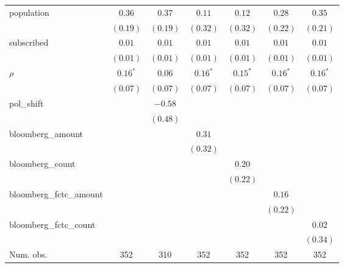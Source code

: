 \begin{table}[!h]
\begin{center}
\begin{tabular}{l c c c c c c }
population              & $0.36$       & $0.37$       & $0.11$       & $0.12$       & $0.28$       & $0.35$       \\
                        & $(0.19)$     & $(0.19)$     & $(0.32)$     & $(0.32)$     & $(0.22)$     & $(0.21)$     \\
subscribed              & $0.01$       & $0.01$       & $0.01$       & $0.01$       & $0.01$       & $0.01$       \\
                        & $(0.01)$     & $(0.01)$     & $(0.01)$     & $(0.01)$     & $(0.01)$     & $(0.01)$     \\
$\rho$                  & $0.16^{*}$   & $0.06$       & $0.16^{*}$   & $0.15^{*}$   & $0.16^{*}$   & $0.16^{*}$   \\
                        & $(0.07)$     & $(0.07)$     & $(0.07)$     & $(0.07)$     & $(0.07)$     & $(0.07)$     \\
pol\_shift              &              & $-0.58$      &              &              &              &              \\
                        &              & $(0.48)$     &              &              &              &              \\
bloomberg\_amount       &              &              & $0.31$       &              &              &              \\
                        &              &              & $(0.32)$     &              &              &              \\
bloomberg\_count        &              &              &              & $0.20$       &              &              \\
                        &              &              &              & $(0.22)$     &              &              \\
bloomberg\_fctc\_amount &              &              &              &              & $0.16$       &              \\
                        &              &              &              &              & $(0.22)$     &              \\
bloomberg\_fctc\_count  &              &              &              &              &              & $0.02$       \\
                        &              &              &              &              &              & $(0.34)$     \\
\midrule
Num. obs.               & 352          & 310          & 352          & 352          & 352          & 352          \\

\end{tabular}
\end{center}
\end{table}
